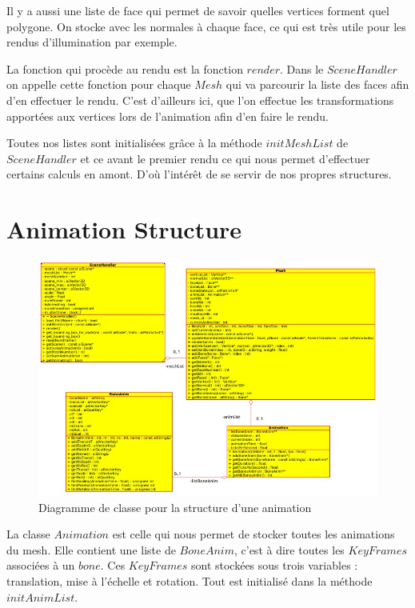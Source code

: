 \documentclass[a4paper]{report}
\begin{document}
\par
Il y a aussi une liste de face qui permet de savoir quelles vertices forment quel polygone. On stocke avec les normales à chaque face, ce qui est très utile pour les rendus d'illumination par exemple.

   

\par
La fonction qui procède au rendu est la fonction $render$. Dans le $SceneHandler$ on appelle cette fonction pour chaque $Mesh$ qui va parcourir la liste des faces afin d'en effectuer le rendu. C'est d'ailleurs ici, que l'on effectue les transformations apportées aux vertices lors de l'animation afin d'en faire le rendu.

\par
Toutes nos listes sont initialisées grâce à la méthode $initMeshList$ de $SceneHandler$ et ce avant le premier rendu ce qui nous permet d'effectuer certains calculs en amont. D'où l'intérêt de se servir de nos propres structures.

    \section{Animation Structure}
\begin{figure}[H]
    \begin{center}
        \includegraphics[width=1\textwidth]{AnimStructure.jpg}
        \caption{Diagramme de classe pour la structure d'une animation}
    \end{center}
\end{figure}

La classe $Animation$ est celle qui nous permet de stocker toutes les animations du mesh. Elle contient une liste de $BoneAnim$, c'est à dire toutes les $KeyFrames$ associées à un $bone$. Ces $KeyFrames$ sont stockées sous trois variables : translation, mise à l'échelle et rotation. Tout est initialisé dans la méthode $initAnimList$.
\end{document}
